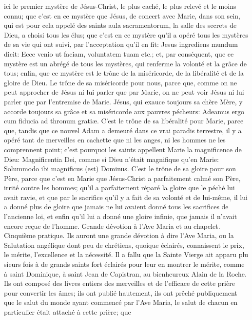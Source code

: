ici le premier mystère de Jésus-Christ, le plus caché, le plus relevé et le moins connu; que c'est en ce mystère que
Jésus, de concert avec Marie, dans son sein, qui est pour cela appelé des saints aula sacramentorum, la salle des
secrets de Dieu, a choisi tous les élus; que c'est en ce mystère qu'il a opéré tous les mystères de sa vie qui ont
suivi, par l'acceptation qu'il en fit: Jesus ingrediens mundum dicit: Ecce venio ut faciam, voluntatem tuam etc.; et,
par conséquent, que ce mystère est un abrégé de tous les mystères, qui renferme la volonté et la grâce de tous;
enfin, que ce mystère est le trône de la miséricorde, de la libéralité et de la gloire de Dieu. Le trône de sa
miséricorde pour nous, parce que, comme on ne peut approcher de Jésus ni lui parler que par Marie, on ne peut
voir Jésus ni lui parler que par l'entremise de Marie. Jésus, qui exauce toujours sa chère Mère, y accorde toujours
sa grâce et sa miséricorde aux pauvres pécheurs: Adeamus ergo cum fiducia ad thronum gratiæ. C'est le trône de
sa libéralité pour Marie, parce que, tandis que ce nouvel Adam a demeuré dans ce vrai paradis terrestre, il y a
opéré tant de merveilles en cachette que ni les anges, ni les hommes ne les comprennent point; c'est pourquoi les
saints appellent Marie la magnificence de Dieu: Magnificentia Dei, comme si Dieu n'était magnifique qu'en Marie:
Solummodo ibi magnificus (est) Dominus. C'est le trône de sa gloire pour son Père, parce que c'est en Marie que
Jésus-Christ a parfaitement calmé son Père, irrité contre les hommes; qu'il a parfaitement réparé la gloire que le
péché lui avait ravie, et que par le sacrifice qu'il y a fait de sa volonté et de lui-même, il lui a donné plus de gloire
que jamais ne lui avaient donné tous les sacrifices de l'ancienne loi, et enfin qu'il lui a donné une gloire infinie, que
jamais il n'avait encore reçue de l'homme.
Grande dévotion à l'Ave Maria et au chapelet.
 Cinquième pratique. Ils auront une grande dévotion à dire l'Ave Maria, ou la Salutation angélique dont peu de
chrétiens, quoique éclairés, connaissent le prix, le mérite, l'excellence et la nécessité. Il a fallu que la Sainte Vierge
ait apparu plu sieurs fois à de grands saints fort éclairés pour leur en montrer le mérite, comme à saint Dominique,
à saint Jean de Capistran, au bienheureux Alain de la Roche. Ils ont composé des livres entiers des merveilles et
de l'efficace de cette prière pour convertir les âmes; ils ont publié hautement, ils ont prêché publiquement que le
salut du monde ayant commencé par l'Ave Maria, le salut de chacun en particulier était attaché à cette prière; que
